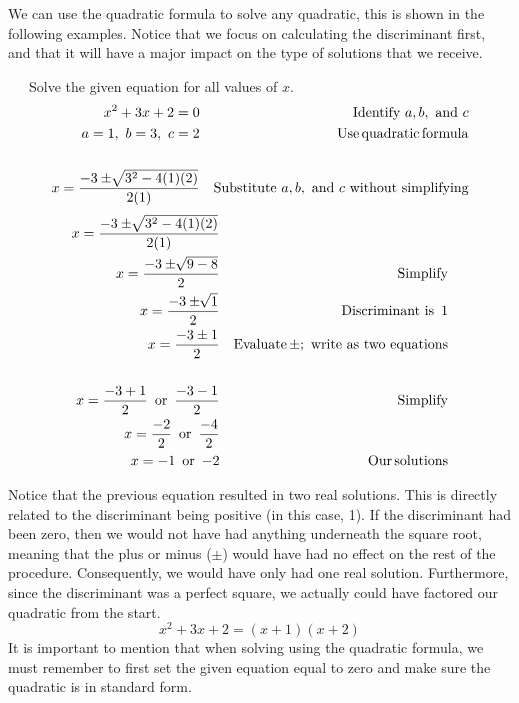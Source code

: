 
We can use the quadratic formula to solve any quadratic, this is shown in the
following examples. 
Notice that we focus on calculating the discriminant first, and that it will have a major impact on the type of solutions that we receive.

\begin{example}~~~Solve the given equation for all values of $x$.
  \begin{eqnarray*}
    x^2 + 3 x + 2 = 0 &  & \text{Identify~} a,b, \text{~and~}c\\
		a = 1,~ b = 3,~ c = 2 & & \tmop{Use} \tmop{quadratic}
    \tmop{formula}\\ 
		& & \\
    x = \frac{- 3 \pm \sqrt[]{3^2 - 4 (1) (2)}}{2 (1)} &  & \text{Substitute~} a,b, \text{~and~} c \text{~without~simplifying}%
   \end{eqnarray*}
	\begin{eqnarray*}
    x = \frac{- 3 \pm \sqrt[]{3^2 - 4 (1) (2)}}{2 (1)} &  & \\%
		x = \frac{- 3 \pm \sqrt[]{9 - 8}}{2} &  & \tmop{Simplify}\\
    x = \frac{- 3 \pm \sqrt[]{1}}{2} &  & \tmop{Discriminant~is~}1\\
    x = \frac{- 3 \pm 1}{2} &  & \tmop{Evaluate} \pm; \text{~write as two equations}\\
& & \\
    x = \frac{- 3 + 1}{2} \tmop{~or~} \frac{- 3 - 1}{2}&  & \tmop{Simplify}\\
    x = \frac{- 2}{2} \tmop{~or~} \frac{- 4}{2} &  & \\
    x = - 1 \tmop{~or~} - 2 &  & \tmop{Our} \tmop{solutions}
  \end{eqnarray*}
\end{example}
Notice that the previous equation resulted in two real solutions.  This is directly related to the discriminant being positive (in this case, 1).  If the discriminant had been zero, then we would not have had anything underneath the square root, meaning that the plus or minus ($\pm$) would have had no effect on the rest of the procedure.  Consequently, we would have only had one real solution.  Furthermore, since the discriminant was a perfect square, we actually could have factored our quadratic from the start.
$$x^2+3x+2=(x+1)(x+2)$$
It is important to mention that when solving using the quadratic formula, we must remember to first set the
given equation equal to zero and make sure the quadratic is in standard form.%

